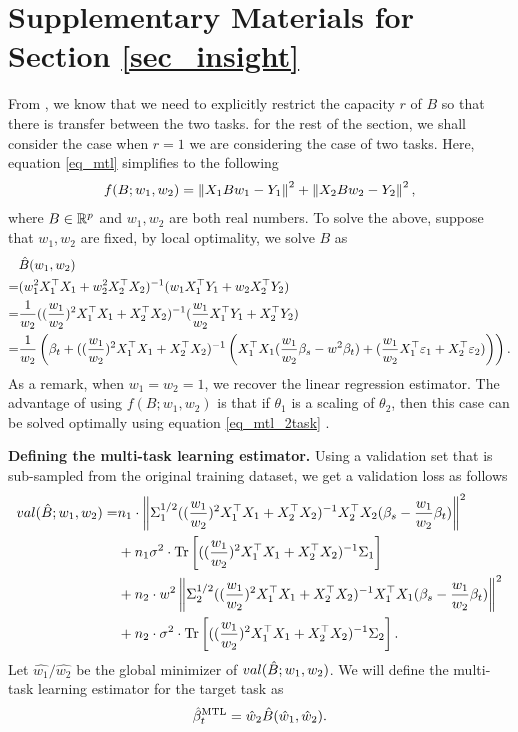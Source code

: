\section{Supplementary Materials for Section \ref{sec_insight}}\label{app_proof_main}

From \cite{WZR20}, we know that we need to explicitly restrict the capacity $r$ of $B$ so that there is transfer between the two tasks.
for the rest of the section, we shall consider the case when $r=1$ we are considering the case of two tasks.
Here, equation \eqref{eq_mtl} simplifies to the following
\begin{align}\label{eq_mtl_2task}
	f(B; w_1, w_2) = \left\| X_1 B w_1 - Y_1 \right\|^2 + \left\| X_2 B w_2 - Y_2 \right\|^2,
\end{align}
where $B\in\mathbb{R}^p$ and $w_1, w_2$ are both real numbers.
To solve the above, suppose that $w_1, w_2$ are fixed, by local optimality, we solve $B$ as
\begin{align*}
	& \hat{B}(w_1, w_2) \\
	=& (w_1^2 X_1^{\top}X_1 + w_2^2 X_2^{\top}X_2)^{-1} (w_1 X_1^{\top}Y_1 + w_2 X_2^{\top}Y_2) \\
	=& \frac{1}{w_2} ((\frac{w_1}{w_2})^2 X_1^{\top}X_1 + X_2^{\top}X_2)^{-1} (\frac{w_1}{w_2} X_1^{\top}Y_1 + X_2^{\top}Y_2) \\
	=& \frac{1}{w_2}\left({\beta_t + ((\frac{w_1}{w_2})^2 X_1^{\top}X_1 + X_2^{\top}X_2)^{-1}\left({X_1^{\top}X_1(\frac{w_1}{w_2}\beta_s - w^2\beta_t) + (\frac{w_1}{w_2} X_1^{\top}\varepsilon_1 + X_2^{\top}\varepsilon_2)}\right)}\right).
\end{align*}
As a remark, when $w_1 = w_2 = 1$, we recover the linear regression estimator.
The advantage of using $f(B; w_1, w_2)$ is that if $\theta_1$ is a scaling of $\theta_2$, then this case can be solved optimally using equation \eqref{eq_mtl_2task} \cite{KD12}.

\textbf{Defining the multi-task learning estimator.}
Using a validation set that is sub-sampled from the original training dataset, we get a validation loss as follows
\begin{align}
		val(\hat{B}; w_1, w_2)
	= & n_1 \cdot \left\| \Sigma_1^{1/2}((\frac{w_1}{w_2})^2 X_1^{\top}X_1 + X_2^{\top}X_2)^{-1}X_2^{\top}X_2(\beta_s - \frac{w_1}{w_2}\beta_t) \right\|^2 \nonumber \\
		&+ n_1 \sigma^2 \cdot \operatorname{Tr}\left[((\frac{w_1}{w_2})^2 X_1^{\top}X_1 + X_2^{\top}X_2)^{-1}\Sigma_1\right] \nonumber \\
		&+ n_2 \cdot w^2\left\| \Sigma_2^{1/2}((\frac{w_1}{w_2})^2 X_1^{\top}X_1 + X_2^{\top}X_2)^{-1}X_1^{\top}X_1(\beta_s - \frac{w_1}{w_2}\beta_t) \right\|^2 \nonumber \\
		&+ n_2 \cdot \sigma^2 \cdot \operatorname{Tr}\left[((\frac{w_1}{w_2})^2 X_1^{\top}X_1 + X_2^{\top}X_2)^{-1}\Sigma_2\right]. \label{eq_val_mtl}
\end{align}
Let $\hat{w_1}/\hat{w_2}$ be the global minimizer of $val(\hat{B}; w_1, w_2)$.
We will define the multi-task learning estimator for the target task as
	\[ \hat{\beta}_t^{\text{MTL}} = \hat{w}_{2}\hat{B}(\hat{w}_1, \hat{w}_2). \]

